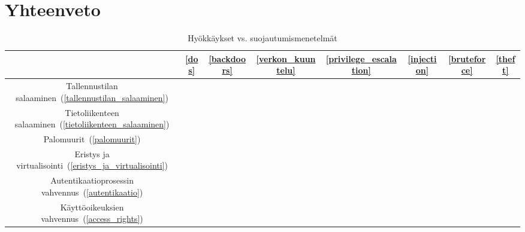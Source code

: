 \chapter{Yhteenveto}\label{yhteenveto}

\begin{table}
\centering{}\caption{Hyökkäykset vs. suojautumismenetelmät\label{tab:security-table}}
\begin{tabular}{c|c|c|c|c|c|c|c|}
   &\ref{dos}&\ref{backdoors}&\ref{verkon_kuuntelu}&\ref{privilege_escalation}&\ref{injection}&\ref{bruteforce}&\ref{theft} \tabularnewline\hline
    Tallennustilan salaaminen~(\ref{tallennustilan_salaaminen}) & & & & & & &\tabularnewline\hline
    Tietoliikenteen salaaminen~(\ref{tietoliikenteen_salaaminen}) & & & & & & &\tabularnewline\hline
    Palomuurit~(\ref{palomuurit}) & & & & & & &\tabularnewline\hline
    Eristys ja virtualisointi~(\ref{eristys_ja_virtualisointi}) & & & & & & &\tabularnewline\hline
    Autentikaatioprosessin vahvennus~(\ref{autentikaatio}) & & & & & & &\tabularnewline\hline
    Käyttöoikeuksien vahvennus~(\ref{access_rights}) & & & & & & &\tabularnewline\hline
\end{tabular}
\end{table}

